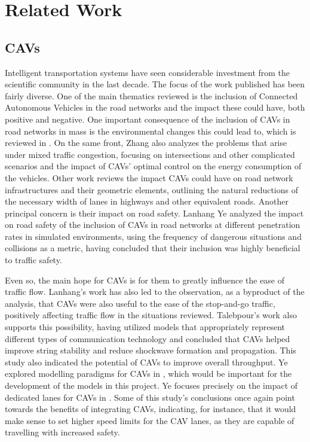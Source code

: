 \section{Related Work}
\label{sec:Related-Work}

\subsection{CAVs}

Intelligent transportation systems have seen considerable investment from the scientific community in the last decade. The focus of the work published has been fairly diverse. One of the main thematics reviewed is the inclusion of Connected Autonomous Vehicles in the road networks and the impact these could have, both positive and negative. One important consequence of the inclusion of CAVs in road networks in mass is the environmental changes this could lead to, which is reviewed in \cite{kopelias2020connected}. On the same front, Zhang \cite{zhang2019impact} also analyzes the problems that arise under mixed traffic congestion, focusing on intersections and other complicated scenarios and the impact of CAVs' optimal control on the energy consumption of the vehicles. Other work reviews the impact CAVs could have on road network infrastructures and their geometric elements, outlining the natural reductions of the necessary width of lanes in highways and other equivalent roads. Another principal concern is their impact on road safety. Lanhang Ye \cite{ye2019evaluating} analyzed the impact on road safety of the inclusion of CAVs in road networks at different penetration rates in simulated environments, using the frequency of dangerous situations and collisions as a metric, having concluded that their inclusion was highly beneficial to traffic safety. 

Even so, the main hope for CAVs is for them to greatly influence the ease of traffic flow. Lanhang's work \cite{ye2019evaluating} has also led to the observation, as a byproduct of the analysis, that CAVs were also useful to the ease of the stop-and-go traffic, positively affecting traffic flow in the situations reviewed. Talebpour's \cite{talebpour2016influence} work also supports this possibility, having utilized models that appropriately represent different types of communication technology and concluded that CAVs helped improve string stability and reduce shockwave formation and propagation. This study also indicated the potential of CAVs to improve overall throughput. Ye explored modelling paradigms for CAVs in \cite{ye2018modeling}, which would be important for the development of the models in this project. Ye focuses precisely on the impact of dedicated lanes for CAVs in \cite{ye2018impact}. Some of this study's conclusions once again point towards the benefits of integrating CAVs, indicating, for instance, that it would make sense to set higher speed limits for the CAV lanes, as they are capable of travelling with increased safety. 

